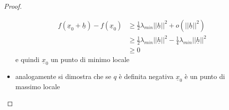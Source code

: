\documentclass[12pt, a4paper]{article}
\theoremstyle{break}
\begin{document}
\begin{proof}
\begin{itemize}
		      \begin{align*}
			      f(\underline{x}_0 + \underline{h}) - f(\underline{x}_0) & \geq
			      \frac{1}{2} \lambda_{min} ||\underline{h}||^2 + o(||\underline{h}||^2)
			      \\ & \geq \frac{1}{2}  \lambda_{min} ||\underline{h}||^2 -
			      \frac{1}{4} \lambda_{min} ||\underline{h}||^2
			      \\ & \geq 0
		      \end{align*}
		      e quindi $\underline{x}_0 $ un punto di minimo locale
		\item analogamente si dimostra che se $q$ è definita negativa
		      $\underline{x}_0$ è un punto di massimo locale
	\end{itemize}
\end{proof}
\end{document}
